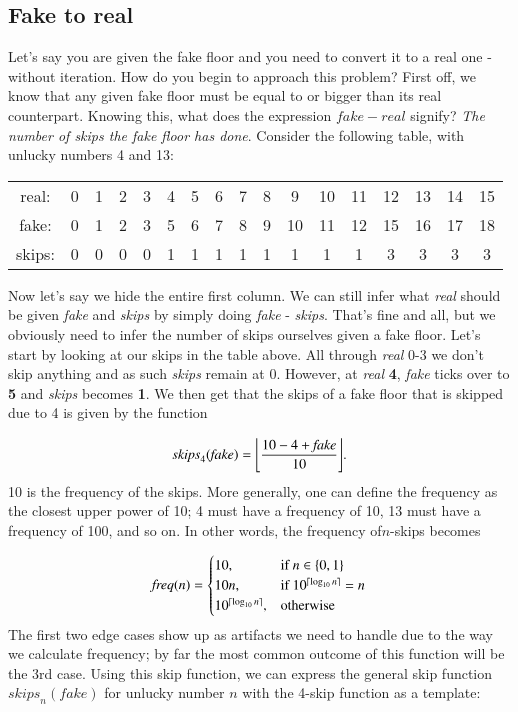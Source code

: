 \documentclass{article}
\DeclarePairedDelimiter\ceil{\lceil}{\rceil}
\DeclarePairedDelimiter\floor{\lfloor}{\rfloor}
\begin{document}
\subsection{Fake to real}

Let's say you are given the fake floor and you need to convert it to a real one - without iteration. How do you begin to approach this problem? First off, we know that any given fake floor must be equal to or bigger than its real counterpart. Knowing this, what does the expression $\mathit{fake} - \mathit{real}$ signify? \textit{The number of skips the fake floor has done}. Consider the following table, with unlucky numbers 4 and 13:

\begin{center}
\begin{tabular}{ c c c c c c c c c c c c c c c c c }
  real:  & 0 & 1 & 2 & 3 & 4 & 5 & 6 & 7 & 8 & 9  & 10 & 11 & 12 & 13 & 14 & 15 \\
  fake:  & 0 & 1 & 2 & 3 & 5 & 6 & 7 & 8 & 9 & 10 & 11 & 12 & 15 & 16 & 17 & 18 \\
  skips: & 0 & 0 & 0 & 0 & 1 & 1 & 1 & 1 & 1 & 1  & 1  & 1  & 3  & 3  & 3  & 3
\end{tabular}
\end{center}
Now let's say we hide the entire first column. We can still infer what \textit{real} should be given \textit{fake} and \textit{skips} by simply doing \textit{fake} - \textit{skips}. 
That's fine and all, but we obviously need to infer the number of skips ourselves given a fake floor. Let's start by looking at our skips in the table above. All through \textit{real} 0-3 we don't skip anything and as such \textit{skips} remain at 0. However, at \textit{real} \textbf{4}, \textit{fake} ticks over to \textbf{5} and \textit{skips} becomes \textbf{1}. We then get that the skips of a fake floor that is skipped due to 4 is given by the function

\[\mathit{skips}_4(\mathit{fake}) = \floor[\Bigg]{\frac{10 - 4 + \mathit{fake}}{10}}.\]
10 is the frequency of the skips. More generally, one can define the frequency as the closest upper power of 10; 4 must have a frequency of 10, 13 must have a frequency of 100, and so on. In other words, the frequency of$n$-skips becomes

\[
    \mathit{freq}(n) = 
\begin{cases}
    10,                          & \text{if } n \in \{0, 1\} \\
    10n,                         & \text{if } 10^{\ceil{\log_{10} n}} = n \\
    10^{\ceil{\log_{10} n}},     & \text{otherwise}
\end{cases}
\]
The first two edge cases show up as artifacts we need to handle due to the way we calculate frequency; by far the most common outcome of this function will be the 3rd case. Using this skip function, we can express the general skip function $\mathit{skips}_n(\mathit{fake})$ for unlucky number $n$ with the 4-skip function as a template: 
\end{document}
